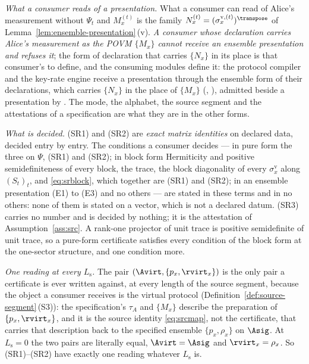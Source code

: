 \begin{definition}
\emph{What a consumer reads of a presentation.} What a consumer can read of
Alice's measurement without $\Psi_t$ and $M^{(t)}_x$ is the family
$N^{(t)}_x=(\sigma^{\mathrm v,(t)}_x)^{\transpose}$ of
Lemma~\ref{lem:ensemble-presentation}\,(v). \emph{A consumer whose
declaration carries Alice's measurement as the POVM $\{M_x\}$ cannot receive
an ensemble presentation and refuses it}; the form of declaration that
carries $\{N_x\}$ in its place is that consumer's to define, and the
consuming modules define it: the protocol compiler and the key-rate engine
receive a presentation through the ensemble form of their declarations,
which carries $\{N_x\}$ in the place of $\{M_x\}$
(,
), admitted beside a presentation by
. The mode, the alphabet, the source
segment and the attestations of a specification are what they are in the
other forms.

\emph{What is decided.} (SR1) and (SR2) are \emph{exact matrix identities}
on declared data, decided entry by entry. The conditions a consumer decides
--- in pure form the three on $\Psi$, (SR1) and (SR2); in block form
Hermiticity and positive semidefiniteness of every block, the trace, the block
diagonality of every $\sigma^{\mathrm v}_x$ along $(S_t)_t$, and
\eqref{eq:srblock}, which together are (SR1) and (SR2); in an ensemble
presentation (E1) to (E3) and no others
--- are stated in these terms and in no others: none of them is stated on a
vector, which is not a declared datum. (SR3) carries no number and is
decided by nothing; it is the attestation of Assumption~\ref{ass:src}. A
rank-one projector of unit trace is positive semidefinite of unit trace, so
a pure-form certificate satisfies every condition of the block form at the
one-sector structure, and one condition more.

\emph{One reading at every $L_{\mathrm s}$.} The pair
$(\Avirt,\{p_x,\rvirt_x\})$ is the only pair a certificate is ever written
against, at every length of the source segment, because the object a
consumer receives is the virtual protocol
(Definition~\ref{def:source-segment}\,(S3)): the specification's $\tau_A$
and $\{M_x\}$ describe the preparation of $\{p_x,\rvirt_x\}$, and it is the
source identity \eqref{eq:srcmap}, not the certificate, that carries that
description back to the specified ensemble $\{p_x,\rho_x\}$ on $\Asig$. At
$L_{\mathrm s}=0$ the two pairs are literally equal, $\Avirt=\Asig$ and
$\rvirt_x=\rho_x$. So (SR1)--(SR2) have exactly one reading whatever
$L_{\mathrm s}$ is.
\end{definition}
